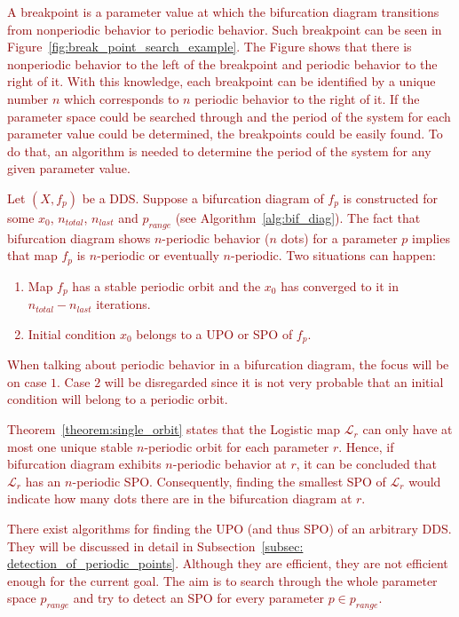 \textcolor{darkred}{
A breakpoint is a parameter value at which the bifurcation diagram transitions from nonperiodic behavior to periodic behavior.
Such breakpoint can be seen in Figure~\ref{fig:break_point_search_example}.
The Figure shows that there is nonperiodic behavior to the left of the breakpoint and periodic behavior to the right of it.
With this knowledge, each breakpoint can be identified by a unique number $n$ which corresponds to $n$ periodic behavior to the right of it.
If the parameter space could be searched through and the period of the system for each parameter value could be determined, the breakpoints could be easily found.
To do that, an algorithm is needed to determine the period of the system for any given parameter value.
}
\par
\textcolor{darkred}{
Let $(X, f_{p})$ be a DDS. Suppose a bifurcation diagram of $f_{p}$ is constructed for some $x_0$, $n_{total}$, $n_{last}$ and $p_{range}$ (see Algorithm~\ref{alg:bif_diag}).
The fact that bifurcation diagram shows $n$-periodic behavior ($n$ dots) for a parameter $p$ implies that map $f_{p}$ is $n$-periodic or eventually $n$-periodic.
Two situations can happen:
\begin{enumerate}
    \item Map $f_{p}$ has a stable periodic orbit and the $x_0$ has converged to it in $n_{total}-n_{last}$ iterations.
    \item Initial condition $x_0$ belongs to a UPO or SPO of $f_p$.
\end{enumerate}
When talking about periodic behavior in a bifurcation diagram, the focus will be on case $1$.
Case $2$ will be disregarded since it is not very probable that an initial condition will belong to a periodic orbit.
}
\par
\textcolor{darkred}{
Theorem~\ref{theorem:single_orbit} states that the Logistic map $\mathcal{L}_r$ can only have at most one unique stable $n$-periodic orbit for each parameter $r$.
Hence, if bifurcation diagram exhibits $n$-periodic behavior at $r$, it can be concluded that $\mathcal{L}_{r}$ has an $n$-periodic SPO.
Consequently, finding the smallest SPO of $\mathcal{L}_{r}$ would indicate how many dots there are in the bifurcation diagram at $r$.
}
\par
\textcolor{darkred}{
There exist algorithms for finding the UPO (and thus SPO) of an arbitrary DDS.
They will be discussed in detail in Subsection~\ref{subsec: detection_of_periodic_points}.
Although they are efficient, they are not efficient enough for the current goal.
The aim is to search through the whole parameter space $p_{range}$ and try to detect an SPO for every parameter $p \in p_{range}$.
}
